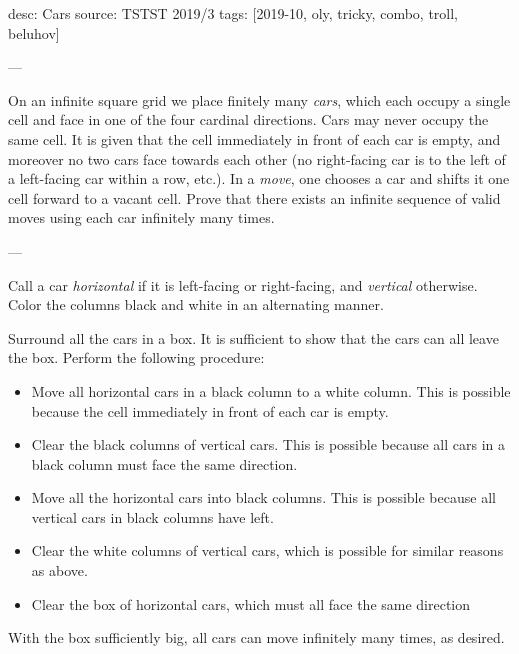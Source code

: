 desc: Cars
source: TSTST 2019/3
tags: [2019-10, oly, tricky, combo, troll, beluhov]

---

On an infinite square grid we place finitely many \emph{cars}, which each occupy a single cell and face in one of the four cardinal directions. Cars may never occupy the same cell. It is given that the cell immediately in front of  each car is empty, and moreover no two cars face towards each other (no right-facing car is to the left of a left-facing car within a row, etc.). In a \emph{move}, one chooses a car and shifts it one cell forward to a vacant cell. Prove that there exists an infinite sequence of valid moves using each car infinitely many times.

---

Call a car \emph{horizontal} if it is left-facing or right-facing, and \emph{vertical} otherwise. Color the columns black and white in an alternating manner.

Surround all the cars in a box. It is sufficient to show that the cars can all leave the box. Perform the following procedure:
\begin{itemize}
    \item Move all horizontal cars in a black column to a white column. This is possible because the cell immediately in front of each car is empty.
    \item Clear the black columns of vertical cars. This is possible because all cars in a black column must face the same direction.
    \item Move all the horizontal cars into black columns. This is possible because all vertical cars in black columns have left.
    \item Clear the white columns of vertical cars, which is possible for similar reasons as above.
    \item Clear the box of horizontal cars, which must all face the same direction
\end{itemize}
With the box sufficiently big, all cars can move infinitely many times, as desired.

